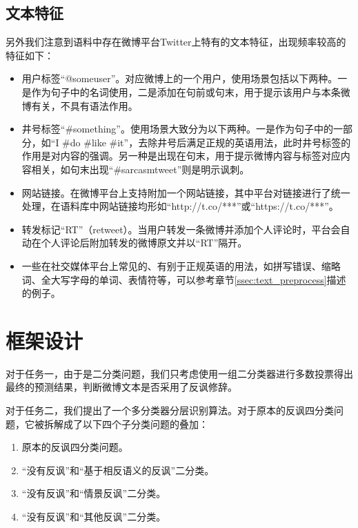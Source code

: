 \subsection{文本特征}
\label{ssec:exp_irony_det_data_text}

另外我们注意到语料中存在微博平台Twitter上特有的文本特征，出现频率较高的特征如下：

\begin{itemize}

\item 用户标签“@someuser”。对应微博上的一个用户，使用场景包括以下两种。一是作为句子中的名词使用，二是添加在句前或句末，用于提示该用户与本条微博有关，不具有语法作用。

\item 井号标签“\#something”。使用场景大致分为以下两种。一是作为句子中的一部分，如“I \#do \#like \#it”，去除井号后满足正规的英语用法，此时井号标签的作用是对内容的强调。另一种是出现在句末，用于提示微博内容与标签对应内容相关，如句末出现“\#sarcasmtweet”则是明示讽刺。

\item 网站链接。在微博平台上支持附加一个网站链接，其中平台对链接进行了统一处理，在语料库中网站链接均形如“http://t.co/***”或“https://t.co/***”。

\item 转发标记“RT”（retweet）。当用户转发一条微博并添加个人评论时，平台会自动在个人评论后附加转发的微博原文并以“RT”隔开。

\item 一些在社交媒体平台上常见的、有别于正规英语的用法，如拼写错误、缩略词、全大写字母的单词、表情符等，可以参考章节\ref{ssec:text_preprocess}描述的例子。

\end{itemize}


\section{框架设计}
\label{sec:exp_irony_det_framework}

对于任务一，由于是二分类问题，我们只考虑使用一组二分类器进行多数投票得出最终的预测结果，判断微博文本是否采用了反讽修辞。

对于任务二，我们提出了一个多分类器分层识别算法。对于原本的反讽四分类问题，它被拆解成了以下四个子分类问题的叠加：

\begin{enumerate}

\item 原本的反讽四分类问题。
\item “没有反讽”和“基于相反语义的反讽”二分类。
\item “没有反讽”和“情景反讽”二分类。
\item “没有反讽”和“其他反讽”二分类。

\end{enumerate}

